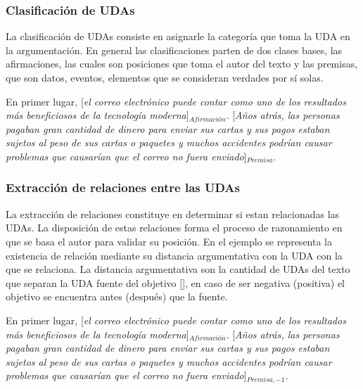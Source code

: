 \subsubsection{Clasificación de UDAs}

La clasificación de UDAs consiste en asignarle la categoría que toma la UDA en la argumentación. En general 
las clasificaciones parten de dos clases bases, las afirmaciones, las cuales son posiciones que toma el 
autor del texto y las premisas, que son datos, eventos, elementos que se consideran verdades por sí solas.  

\begin{adjustwidth}{25pt}{25pt}
    En primer lugar, [\emph{el correo electrónico puede contar como uno de los resultados
    más beneficiosos de la tecnología moderna}]$_{Afirmación}$. [\emph{Años atrás, las personas pagaban gran cantidad de dinero para 
    enviar sus cartas y sus pagos estaban sujetos al peso de sus cartas o paquetes y muchos accidentes podrían 
    causar problemas que causarían que el correo no fuera enviado}]$_{Premisa}$.
\end{adjustwidth}

\subsubsection{Extracción de relaciones entre las UDAs}

La extracción de relaciones constituye en determinar si estan relacionadas las UDAs. La disposición de estas
relaciones forma el proceso de razonamiento en que se basa el autor para validar su posición. En el ejemplo 
se representa la existencia de relación mediante su distancia argumentativa con la UDA con la que se relaciona.
La distancia argumentativa son la cantidad de UDAs del texto que separan la UDA fuente del objetivo [\cite{galassi2018argumentative}], 
en caso de ser negativa (positiva) el objetivo se encuentra antes (después) que la fuente.

\begin{adjustwidth}{25pt}{25pt}
    En primer lugar, [\emph{el correo electrónico puede contar como uno de los resultados
    más beneficiosos de la tecnología moderna}]$_{Afirmación}$. [\emph{Años atrás, las personas pagaban gran cantidad de dinero para 
    enviar sus cartas y sus pagos estaban sujetos al peso de sus cartas o paquetes y muchos accidentes podrían 
    causar problemas que causarían que el correo no fuera enviado}]$_{Premisa, -1}$.
\end{adjustwidth}


